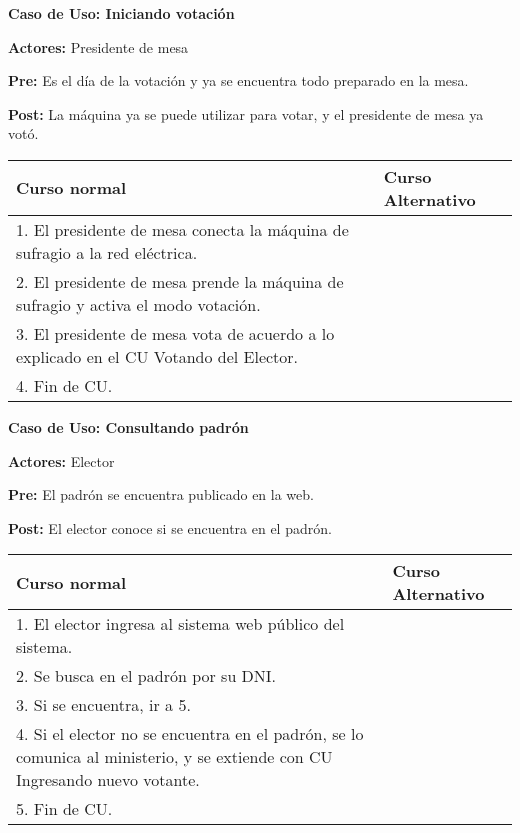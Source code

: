 \textbf{Caso de Uso: Iniciando votación}

\textbf{Actores:} Presidente de mesa

\textbf{Pre:} Es el día de la votación y ya se encuentra todo preparado en la mesa.

\textbf{Post:} La máquina ya se puede utilizar para votar, y el presidente de mesa ya votó.

\begin{table}[h!]
	
 \begin{tabular}{|p{7.5cm} | p{7.5cm}|} 
 \hline
 \textbf{Curso normal} & \textbf{Curso Alternativo} \\
 \hline

1. El presidente de mesa conecta la máquina de sufragio a la red eléctrica. & \\
\hline
2. El presidente de mesa prende la máquina de sufragio y activa el modo votación. & \\
\hline
3. El presidente de mesa vota de acuerdo a lo explicado en el CU Votando del Elector. & \\
\hline
4. Fin de CU.& \\
\hline



 \end{tabular}

\end{table}



\textbf{Caso de Uso:  Consultando padrón}

\textbf{Actores:} Elector 

\textbf{Pre:} El padrón se encuentra publicado en la web. 

\textbf{Post:}  El elector conoce si se encuentra en el padrón.

\begin{table}[h!]
	
 \begin{tabular}{|p{7.5cm} | p{7.5cm}|} 
 \hline
 \textbf{Curso normal} & \textbf{Curso Alternativo} \\
 \hline

1. El elector ingresa al sistema web público del sistema. & \\
 \hline



2. Se busca en el padrón por su DNI. & \\
 \hline



3. Si se encuentra, ir a 5. & \\
 \hline



4. Si el elector no se encuentra en el padrón, se lo comunica al ministerio, y se extiende con CU Ingresando nuevo votante. & \\
 \hline



5. Fin de CU. & \\
 \hline


 \end{tabular}

\end{table}




